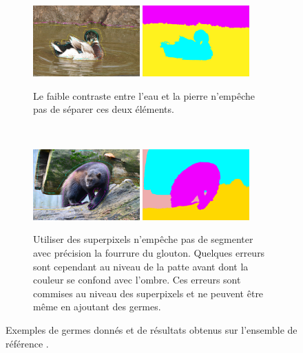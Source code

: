 \begin{figure}[htb]
	\centering	
	 \begin{subfigure}[B]{\textwidth}
	 \centering
			\includegraphics[width=0.45\textwidth]{images/evaluation/HSID/img_5_seeds}
			\includegraphics[width=0.45\textwidth]{images/evaluation/HSID/img_5_seg}
		 \caption{Le faible contraste entre l'eau et la pierre n'empêche pas de séparer ces deux éléments.}
	\end{subfigure}		
	\\	
	 \begin{subfigure}[B]{\textwidth}	
	 \centering
			\includegraphics[width=0.45\textwidth]{images/evaluation/HSID/img_12_seeds}
			\includegraphics[width=0.45\textwidth]{images/evaluation/HSID/img_12_seg}
		 \caption{Utiliser des superpixels n'empêche pas de segmenter avec précision la fourrure du glouton. Quelques erreurs sont cependant  au niveau de la patte avant  dont la couleur se confond avec l'ombre. Ces erreurs sont commises au niveau des superpixels et ne peuvent  être  même en ajoutant des germes.} 
	\end{subfigure}	
	\caption{Exemples de germes donnés et de résultats obtenus sur l'ensemble de référence .}
	\label{fig:eval:ResHSID}
\end{figure}

